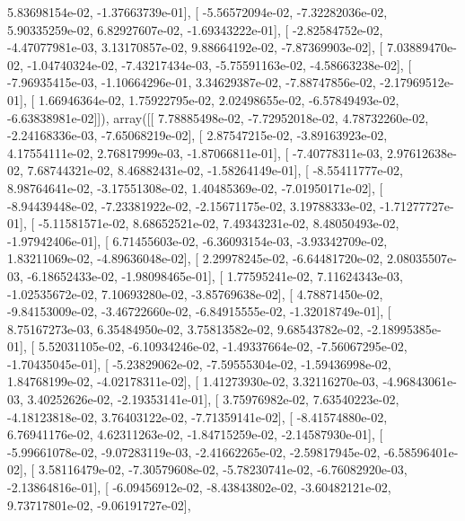 \documentclass{article}
\begin{document}
          5.83698154e-02,  -1.37663739e-01],
       [ -5.56572094e-02,  -7.32282036e-02,   5.90335259e-02,
          6.82927607e-02,  -1.69343222e-01],
       [ -2.82584752e-02,  -4.47077981e-03,   3.13170857e-02,
          9.88664192e-02,  -7.87369903e-02],
       [  7.03889470e-02,  -1.04740324e-02,  -7.43217434e-03,
         -5.75591163e-02,  -4.58663238e-02],
       [ -7.96935415e-03,  -1.10664296e-01,   3.34629387e-02,
         -7.88747856e-02,  -2.17969512e-01],
       [  1.66946364e-02,   1.75922795e-02,   2.02498655e-02,
         -6.57849493e-02,  -6.63838981e-02]]), array([[  7.78885498e-02,  -7.72952018e-02,   4.78732260e-02,
         -2.24168336e-03,  -7.65068219e-02],
       [  2.87547215e-02,  -3.89163923e-02,   4.17554111e-02,
          2.76817999e-03,  -1.87066811e-01],
       [ -7.40778311e-03,   2.97612638e-02,   7.68744321e-02,
          8.46882431e-02,  -1.58264149e-01],
       [ -8.55411777e-02,   8.98764641e-02,  -3.17551308e-02,
          1.40485369e-02,  -7.01950171e-02],
       [ -8.94439448e-02,  -7.23381922e-02,  -2.15671175e-02,
          3.19788333e-02,  -1.71277727e-01],
       [ -5.11581571e-02,   8.68652521e-02,   7.49343231e-02,
          8.48050493e-02,  -1.97942406e-01],
       [  6.71455603e-02,  -6.36093154e-03,  -3.93342709e-02,
          1.83211069e-02,  -4.89636048e-02],
       [  2.29978245e-02,  -6.64481720e-02,   2.08035507e-03,
         -6.18652433e-02,  -1.98098465e-01],
       [  1.77595241e-02,   7.11624343e-03,  -1.02535672e-02,
          7.10693280e-02,  -3.85769638e-02],
       [  4.78871450e-02,  -9.84153009e-02,  -3.46722660e-02,
         -6.84915555e-02,  -1.32018749e-01],
       [  8.75167273e-03,   6.35484950e-02,   3.75813582e-02,
          9.68543782e-02,  -2.18995385e-01],
       [  5.52031105e-02,  -6.10934246e-02,  -1.49337664e-02,
         -7.56067295e-02,  -1.70435045e-01],
       [ -5.23829062e-02,  -7.59555304e-02,  -1.59436998e-02,
          1.84768199e-02,  -4.02178311e-02],
       [  1.41273930e-02,   3.32116270e-03,  -4.96843061e-03,
          3.40252626e-02,  -2.19353141e-01],
       [  3.75976982e-02,   7.63540223e-02,  -4.18123818e-02,
          3.76403122e-02,  -7.71359141e-02],
       [ -8.41574880e-02,   6.76941176e-02,   4.62311263e-02,
         -1.84715259e-02,  -2.14587930e-01],
       [ -5.99661078e-02,  -9.07283119e-03,  -2.41662265e-02,
         -2.59817945e-02,  -6.58596401e-02],
       [  3.58116479e-02,  -7.30579608e-02,  -5.78230741e-02,
         -6.76082920e-03,  -2.13864816e-01],
       [ -6.09456912e-02,  -8.43843802e-02,  -3.60482121e-02,
          9.73717801e-02,  -9.06191727e-02],
\end{document}
